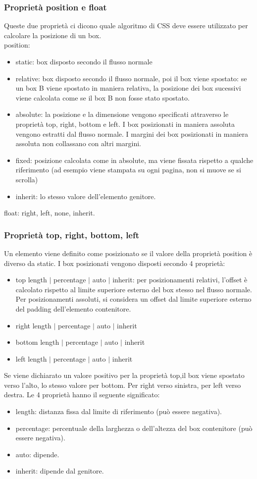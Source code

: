 \documentclass{article}
\begin{document}
\subsubsection{Proprietà position e float}
Queste due proprietà ci dicono quale algoritmo di CSS deve essere utilizzato per calcolare la posizione di un box.\\
position:
\begin{itemize}
	\item static: box disposto secondo il flusso normale
	\item relative: box disposto secondo il flusso normale, poi il box viene spostato: se un box B viene spostato in maniera relativa, la posizione dei box sucessivi viene calcolata come se il box B non fosse stato spostato.
	\item absolute: la posizione e la dimensione vengono specificati attraverso le proprietà top, right, bottom e left. I box posizionati in maniera assoluta vengono estratti dal flusso normale. I margini dei box posizionati in maniera assoluta non collassano con altri margini.
	\item fixed: posizione calcolata come in absolute, ma viene fissata rispetto a qualche riferimento (ad esempio viene stampata su ogni pagina, non si muove se si scrolla)
	\item inherit: lo stesso valore dell'elemento genitore.
\end{itemize}
float: right, left, none, inherit.
\subsubsection{Proprietà top, right, bottom, left}
Un elemento viene definito come posizionato se il valore della proprietà position è diverso da static. I box posizionati vengono disposti secondo 4 proprietà:
\begin{itemize}
	\item top length $|$ percentage $|$ auto $|$ inherit: per posizionamenti relativi, l'offset è calcolato rispetto al limite superiore esterno del box stesso nel flusso normale. Per posizionamenti assoluti, si considera un offset dal limite superiore esterno del padding dell'elemento contenitore.
	\item right length $|$ percentage $|$ auto $|$ inherit
	\item bottom length $|$ percentage $|$ auto $|$ inherit
	\item left length $|$ percentage $|$ auto $|$ inherit
\end{itemize}
Se viene dichiarato un valore positivo per la proprietà top,il box viene spostato verso l'alto, lo stesso valore per bottom. Per right verso sinistra, per left verso destra.
Le 4 proprietà hanno il seguente significato:
\begin{itemize}
	\item length: distanza fissa dal limite di riferimento (può essere negativa).
	\item percentage: percentuale della larghezza o dell'altezza del box contenitore (può essere negativa).
	\item auto: dipende.
	\item inherit: dipende dal genitore.
\end{itemize}
\end{document}
